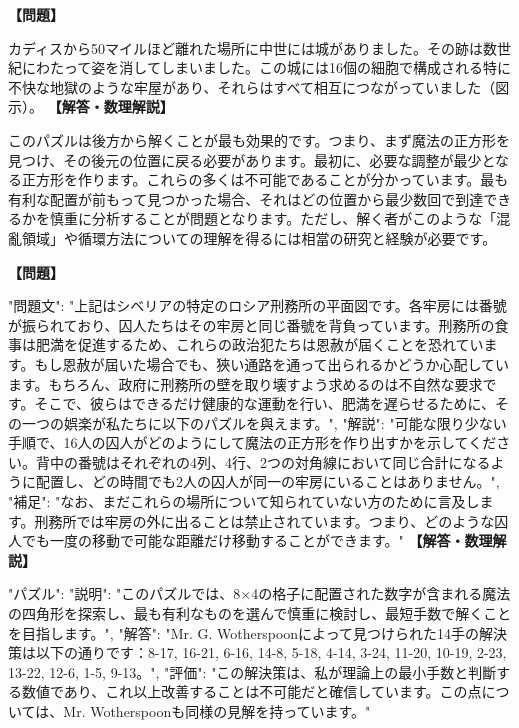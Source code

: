 \documentclass[10pt,a4paper,oneside,openany]{ltjsbook}
\begin{document}
\begin{tcolorbox}[colback=softblue,colframe=primaryblue,title=\textbf{第 403 問：スペインの地牢 （原題: THE SPANISH DUNGEON.）},arc=2mm,boxrule=1pt,breakable]
\textbf{【問題】}\par\vspace{0.3em}
カディスから50マイルほど離れた場所に中世には城がありました。その跡は数世紀にわたって姿を消してしまいました。この城には16個の細胞で構成される特に不快な地獄のような牢屋があり、それらはすべて相互につながっていました（図示）。
\tcblower
\textbf{【解答・数理解説】}\par\vspace{0.3em}
このパズルは後方から解くことが最も効果的です。つまり、まず魔法の正方形を見つけ、その後元の位置に戻る必要があります。最初に、必要な調整が最少となる正方形を作ります。これらの多くは不可能であることが分かっています。最も有利な配置が前もって見つかった場合、それはどの位置から最少数回で到達できるかを慎重に分析することが問題となります。ただし、解く者がこのような「混亂領域」や循環方法についての理解を得るには相當の研究と経験が必要です。
\end{tcolorbox}

\begin{tcolorbox}[colback=softblue,colframe=primaryblue,title=\textbf{第 404 問：THE SIBERIAN DUNGEONS.},arc=2mm,boxrule=1pt,breakable]
\textbf{【問題】}\par\vspace{0.3em}
{
  "問題文": "上記はシベリアの特定のロシア刑務所の平面図です。各牢房には番號が振られており、囚人たちはその牢房と同じ番號を背負っています。刑務所の食事は肥満を促進するため、これらの政治犯たちは恩赦が屆くことを恐れています。もし恩赦が屆いた場合でも、狹い通路を通って出られるかどうか心配しています。もちろん、政府に刑務所の壁を取り壊すよう求めるのは不自然な要求です。そこで、彼らはできるだけ健康的な運動を行い、肥満を遅らせるために、その一つの娯楽が私たちに以下のパズルを與えます。",
  "解説": "可能な限り少ない手順で、16人の囚人がどのようにして魔法の正方形を作り出すかを示してください。背中の番號はそれぞれの4列、4行、2つの対角線において同じ合計になるように配置し、どの時間でも2人の囚人が同一の牢房にいることはありません。",
  "補足": "なお、まだこれらの場所について知られていない方のために言及します。刑務所では牢房の外に出ることは禁止されています。つまり、どのような囚人でも一度の移動で可能な距離だけ移動することができます。"
}
\tcblower
\textbf{【解答・数理解説】}\par\vspace{0.3em}
{
"パズル": {
"説明": "このパズルでは、8×4の格子に配置された数字が含まれる魔法の四角形を探索し、最も有利なものを選んで慎重に検討し、最短手数で解くことを目指します。",
"解答": "Mr. G. Wotherspoonによって見つけられた14手の解決策は以下の通りです：8-17, 16-21, 6-16, 14-8, 5-18, 4-14, 3-24, 11-20, 10-19, 2-23, 13-22, 12-6, 1-5, 9-13。",
"評価": "この解決策は、私が理論上の最小手数と判斷する数値であり、これ以上改善することは不可能だと確信しています。この点については、Mr. Wotherspoonも同様の見解を持っています。"
} 
}
\end{tcolorbox}
\end{document}
